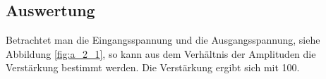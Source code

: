 \documentclass[12pt,a4paper]{article}
\begin{document}
\subsection{Auswertung}

Betrachtet man die Eingangsspannung und die Ausgangsspannung, siehe Abbildung \ref{fig:a_2_1}, so kann aus dem Verhältnis der Amplituden die Verstärkung bestimmt werden. Die Verstärkung ergibt sich mit 100.
\end{document}
